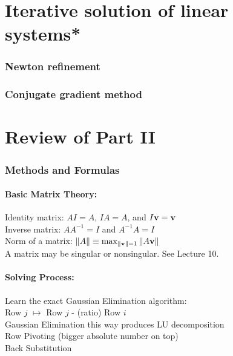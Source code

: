 \chapter{Iterative solution of linear systems*}



\subsection*{Newton refinement}


\subsection*{Conjugate gradient method}




\chapter*{Review of Part II}
\subsection*{Methods and Formulas}


\subsubsection*{Basic Matrix Theory:}
Identity matrix: $ A I = A$, $I A = A$, and $I \mathbf{v} = \mathbf{v}$ \\
Inverse matrix: $ A A^{-1} = I$ and $ A^{-1} A = I$\\
Norm of a matrix: $ \|A\| \equiv \max_{\|\mathbf{v}\|=1} \|A\mathbf{v}\|$\\
A matrix may be singular or nonsingular. See Lecture 10.

\subsubsection*{Solving Process:}
Learn the exact Gaussian Elimination algorithm:\\
   Row $j$  $\mapsto$ Row $j$ - (ratio) Row $i$ \\
Gaussian Elimination this way produces LU decomposition\\
Row Pivoting (bigger absolute number on top) \\
Back Substitution


